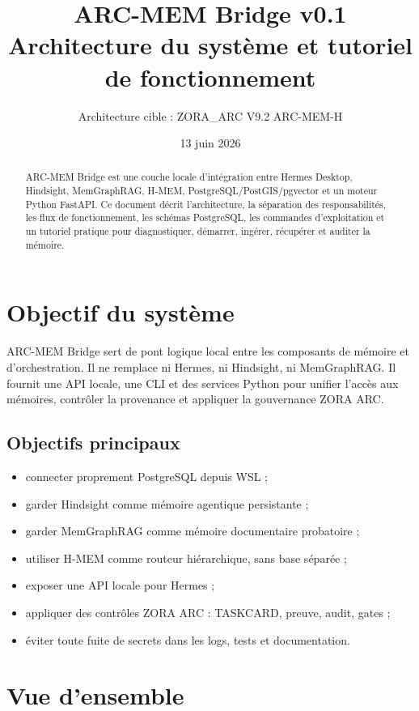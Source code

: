 \documentclass[11pt,a4paper]{article}
\title{\textbf{ARC-MEM Bridge v0.1}\\Architecture du système et tutoriel de fonctionnement}
\author{Architecture cible : ZORA\_ARC V9.2 ARC-MEM-H}
\date{13 juin 2026}
\begin{document}
\maketitle

\begin{abstract}
ARC-MEM Bridge est une couche locale d'intégration entre Hermes Desktop, Hindsight,
MemGraphRAG, H-MEM, PostgreSQL/PostGIS/pgvector et un moteur Python FastAPI. Ce
document décrit l'architecture, la séparation des responsabilités, les flux de
fonctionnement, les schémas PostgreSQL, les commandes d'exploitation et un tutoriel
pratique pour diagnostiquer, démarrer, ingérer, récupérer et auditer la mémoire.
\end{abstract}

\tableofcontents
\newpage

\section{Objectif du système}

ARC-MEM Bridge sert de pont logique local entre les composants de mémoire et
d'orchestration. Il ne remplace ni Hermes, ni Hindsight, ni MemGraphRAG. Il fournit
une API locale, une CLI et des services Python pour unifier l'accès aux mémoires,
contrôler la provenance et appliquer la gouvernance ZORA ARC.

\subsection{Objectifs principaux}

\begin{itemize}[leftmargin=*]
  \item connecter proprement PostgreSQL depuis WSL ;
  \item garder Hindsight comme mémoire agentique persistante ;
  \item garder MemGraphRAG comme mémoire documentaire probatoire ;
  \item utiliser H-MEM comme routeur hiérarchique, sans base séparée ;
  \item exposer une API locale pour Hermes ;
  \item appliquer des contrôles ZORA ARC : TASKCARD, preuve, audit, gates ;
  \item éviter toute fuite de secrets dans les logs, tests et documentation.
\end{itemize}

\section{Vue d'ensemble}
\end{document}
